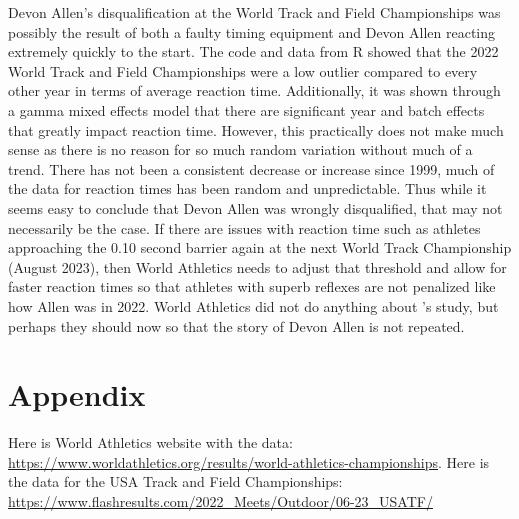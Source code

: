 \documentclass[12pt, letterpaper, titlepage]{article}
\begin{document}
Devon Allen's disqualification at the World Track and Field Championships was
possibly the result of both a faulty timing equipment and Devon Allen
reacting extremely quickly to the start.  The code and data from R showed that
the 2022 World Track and Field Championships were a low outlier compared to
every other year in terms of average reaction time.  Additionally, it was shown
through a gamma mixed effects model that there are significant year and batch
effects that greatly impact reaction time.  However, this practically does not make much sense
as there is no reason for so much random variation without much of a trend.
There has not been a consistent decrease or increase since 1999, much of the data
for reaction times has been random and unpredictable.  Thus while it seems easy
to conclude that Devon Allen was wrongly disqualified, that may not necessarily
be the case.  If there are issues with reaction time such as athletes approaching the 0.10 
second barrier again at the next World Track Championship (August 2023), then World Athletics 
needs to adjust that threshold and allow for faster reaction times so that athletes with superb 
reflexes are not penalized like how Allen was in 2022.  World Athletics did not
do anything about \citet{komi2009iaaf}'s study, but perhaps they should now so
that the story of Devon Allen is not repeated.



\section{Appendix}
\label{sec:appendix}
Here is World Athletics website with the data: \url{https://www.worldathletics.org/results/world-athletics-championships}.
Here is the data for the USA Track and Field Championships: \url{https://www.flashresults.com/2022_Meets/Outdoor/06-23_USATF/}





\end{document}
